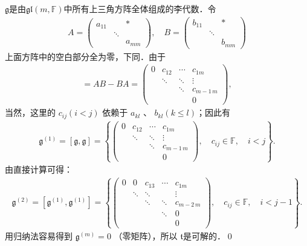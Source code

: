 $\mathfrak{g}$是由$\mathfrak{gl}(m,\mathbb{F})$中所有上三角方阵全体组成的李代数．令
\begin{align*}
A=\left(\begin{array}{lll}
    a_{11} & & * \\
    & \ddots & \\
    & & a_{m m}
\end{array}\right), \quad
B=\left(\begin{array}{lll}
    b_{11} & & * \\
    & \ddots & \\
    & & b_{mm}
\end{array}\right)
\end{align*}
上面方阵中的空白部分全为零，下同．由于
\begin{align*}
[A, B]=A B-B A=\left(\begin{array}{cccc}
    0 & c_{12} & \cdots & c_{1 m} \\
    & \ddots & \ddots & \vdots \\
    & & \ddots & c_{m-1\, m} \\
    & & & 0
\end{array}\right),
\end{align*}
当然，这里的 $c_{i j}(i<j)$ 依赖于 $a_{kl}$ 、 $b_{kl}(k \leqslant l)$；因此有
\begin{align*}
\mathfrak{g}^{(1)}=[\mathfrak{g}, \mathfrak{g}]
=\left\{\left(\begin{array}{cccc}
    0 & c_{12} & \cdots & c_{1 m} \\
    & \ddots & \ddots & \vdots \\
    & & \ddots & c_{m-1\, m} \\
    & & & 0
\end{array}\right),
\quad c_{i j} \in \mathbb{F}, \quad i<j\right\} .
\end{align*}
由直接计算可得：
\begin{align*}
\mathfrak{g}^{(2)}=\left[\mathfrak{g}^{(1)}, \mathfrak{g}^{(1)}\right]
=\left\{\left(\begin{array}{ccccc}
    0 & 0 & c_{13} & \cdots & c_{1 m} \\
    & \ddots & \ddots & & \vdots \\
    & & \ddots & \ddots & c_{m-2\, m} \\
    & & & \ddots & 0 \\
    & & & & 0
\end{array}\right),
\quad c_{ij} \in \mathbb{F},\quad i<j-1\right\} .
\end{align*}
用归纳法容易得到 $\mathfrak{g}^{(m)}=0$ （零矩阵），所以 $\mathfrak{t}$是可解的．\qed

